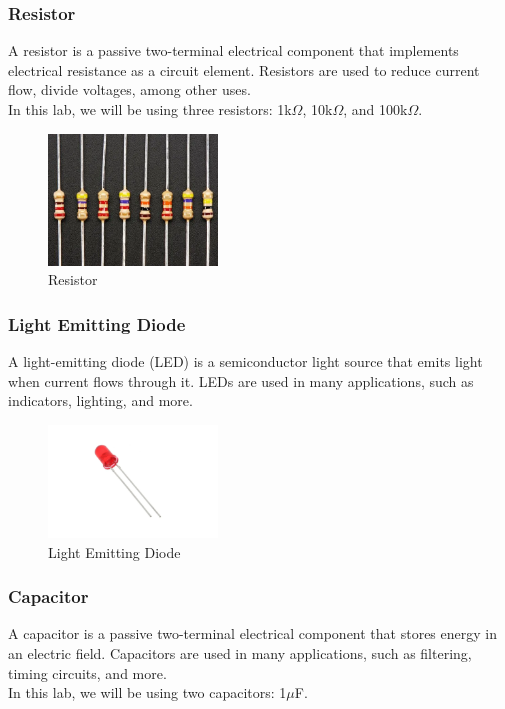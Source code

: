 \documentclass[a4paper, 10pt]{article}
\begin{document}
			\pagebreak
			\subsubsection{Resistor}
				A resistor is a passive two-terminal electrical component that implements electrical resistance as a circuit element. 
				Resistors are used to reduce current flow, divide voltages, among other uses.\\
				In this lab, we will be using three resistors: 1k$\Omega$, 10k$\Omega$, and 100k$\Omega$.\\

				\begin{figure}[h!]
					\centering
					\includegraphics[width=0.4\textwidth]{./images/resistors.png}
					\caption{Resistor}
					\label{fig:resistor}
				\end{figure}

			\subsubsection{Light Emitting Diode}
				A light-emitting diode (LED) is a semiconductor light source that emits light when current flows through it. 
				LEDs are used in many applications, such as indicators, lighting, and more.\\

				\begin{figure}[h!]
					\centering
					\includegraphics[width=0.4\textwidth]{./images/LED.jpeg}
					\caption{Light Emitting Diode}
					\label{fig:led}
				\end{figure}

			\subsubsection{Capacitor}
				A capacitor is a passive two-terminal electrical component that stores energy in an electric field. 
				Capacitors are used in many applications, such as filtering, timing circuits, and more.\\
				In this lab, we will be using two capacitors: 1$\mu$F.\\
\end{document}
